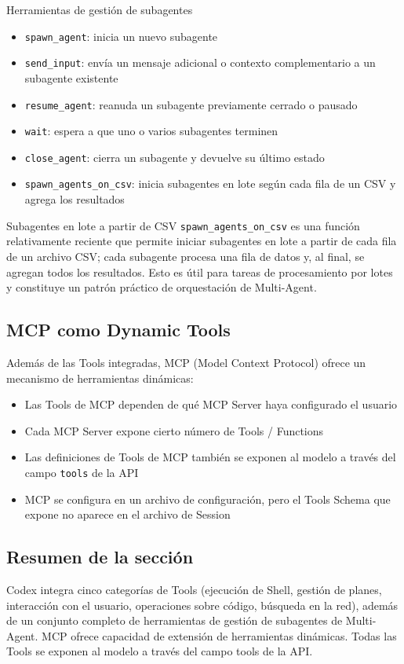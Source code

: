 \begin{importantbox}{Herramientas de gestión de subagentes}
\begin{itemize}
    \item \texttt{spawn\_agent}: inicia un nuevo subagente
    \item \texttt{send\_input}: envía un mensaje adicional o contexto complementario a un subagente existente
    \item \texttt{resume\_agent}: reanuda un subagente previamente cerrado o pausado
    \item \texttt{wait}: espera a que uno o varios subagentes terminen
    \item \texttt{close\_agent}: cierra un subagente y devuelve su último estado
    \item \texttt{spawn\_agents\_on\_csv}: inicia subagentes en lote según cada fila de un CSV y agrega los resultados
\end{itemize}
\end{importantbox}

\begin{knowledgebox}{Subagentes en lote a partir de CSV}
\texttt{spawn\_agents\_on\_csv} es una función relativamente reciente que permite iniciar subagentes en lote a partir de cada fila de un archivo CSV; cada subagente procesa una fila de datos y, al final, se agregan todos los resultados. Esto es útil para tareas de procesamiento por lotes y constituye un patrón práctico de orquestación de Multi-Agent.
\end{knowledgebox}

\subsection{MCP como Dynamic Tools}

Además de las Tools integradas, MCP (Model Context Protocol) ofrece un mecanismo de herramientas dinámicas:

\begin{itemize}
    \item Las Tools de MCP dependen de qué MCP Server haya configurado el usuario
    \item Cada MCP Server expone cierto número de Tools / Functions
    \item Las definiciones de Tools de MCP también se exponen al modelo a través del campo \texttt{tools} de la API
    \item MCP se configura en un archivo de configuración, pero el Tools Schema que expone no aparece en el archivo de Session
\end{itemize}

\subsection{Resumen de la sección}

Codex integra cinco categorías de Tools (ejecución de Shell, gestión de planes, interacción con el usuario, operaciones sobre código, búsqueda en la red), además de un conjunto completo de herramientas de gestión de subagentes de Multi-Agent. MCP ofrece capacidad de extensión de herramientas dinámicas. Todas las Tools se exponen al modelo a través del campo tools de la API.
